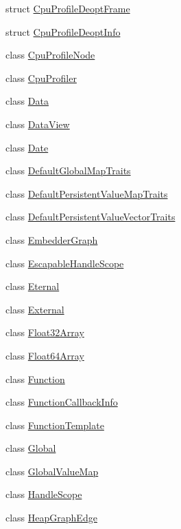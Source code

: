 \begin{DoxyCompactItemize}
struct \mbox{\hyperlink{structv8_1_1CpuProfileDeoptFrame}{Cpu\+Profile\+Deopt\+Frame}}
\item 
struct \mbox{\hyperlink{structv8_1_1CpuProfileDeoptInfo}{Cpu\+Profile\+Deopt\+Info}}
\item 
class \mbox{\hyperlink{classv8_1_1CpuProfileNode}{Cpu\+Profile\+Node}}
\item 
class \mbox{\hyperlink{classv8_1_1CpuProfiler}{Cpu\+Profiler}}
\item 
class \mbox{\hyperlink{classv8_1_1Data}{Data}}
\item 
class \mbox{\hyperlink{classv8_1_1DataView}{Data\+View}}
\item 
class \mbox{\hyperlink{classv8_1_1Date}{Date}}
\item 
class \mbox{\hyperlink{classv8_1_1DefaultGlobalMapTraits}{Default\+Global\+Map\+Traits}}
\item 
class \mbox{\hyperlink{classv8_1_1DefaultPersistentValueMapTraits}{Default\+Persistent\+Value\+Map\+Traits}}
\item 
class \mbox{\hyperlink{classv8_1_1DefaultPersistentValueVectorTraits}{Default\+Persistent\+Value\+Vector\+Traits}}
\item 
class \mbox{\hyperlink{classv8_1_1EmbedderGraph}{Embedder\+Graph}}
\item 
class \mbox{\hyperlink{classv8_1_1EscapableHandleScope}{Escapable\+Handle\+Scope}}
\item 
class \mbox{\hyperlink{classv8_1_1Eternal}{Eternal}}
\item 
class \mbox{\hyperlink{classv8_1_1External}{External}}
\item 
class \mbox{\hyperlink{classv8_1_1Float32Array}{Float32\+Array}}
\item 
class \mbox{\hyperlink{classv8_1_1Float64Array}{Float64\+Array}}
\item 
class \mbox{\hyperlink{classv8_1_1Function}{Function}}
\item 
class \mbox{\hyperlink{classv8_1_1FunctionCallbackInfo}{Function\+Callback\+Info}}
\item 
class \mbox{\hyperlink{classv8_1_1FunctionTemplate}{Function\+Template}}
\item 
class \mbox{\hyperlink{classv8_1_1Global}{Global}}
\item 
class \mbox{\hyperlink{classv8_1_1GlobalValueMap}{Global\+Value\+Map}}
\item 
class \mbox{\hyperlink{classv8_1_1HandleScope}{Handle\+Scope}}
\item 
class \mbox{\hyperlink{classv8_1_1HeapGraphEdge}{Heap\+Graph\+Edge}}

\end{DoxyCompactItemize}
